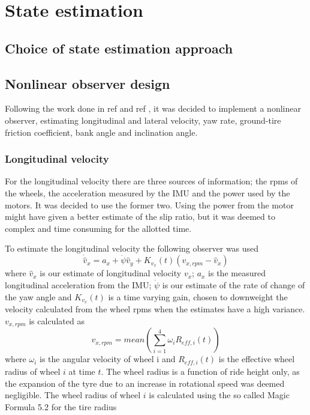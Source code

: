 \section{State estimation}
\subsection{Choice of state estimation approach}
\subsection{Nonlinear observer design}


Following the work done in ref \cite{Automatica08} and ref \cite{MainStateEst}, it was decided to implement a nonlinear observer, estimating longitudinal and lateral velocity, yaw rate, ground-tire friction coefficient, bank angle and inclination angle. 

\subsubsection{Longitudinal velocity}
For the longitudinal velocity there are three sources of information; the rpms of the wheels, the acceleration measured by the IMU and the power used by the motors. It was decided to use the former two. Using the power from the motor might have given a better estimate of the slip ratio, but it was deemed to complex and time consuming for the allotted time. 

To estimate the longitudinal velocity the following observer was used
\begin{equation}
    \dot{\hat{v}}_x = a_x + \dot{\psi}\hat{v}_y + K_{v_x}(t)(v_{x,rpm} - \hat{v}_x)
\end{equation}
where $\hat{v}_x$ is our estimate of longitudinal velocity $v_x$; $a_x$ is the measured longitudinal acceleration from the IMU; $\dot{\psi}$ is our estimate of the rate of change of the yaw angle and $K_{v_x}(t)$ is a time varying gain, chosen to downweight the velocity calculated from the wheel rpms when the estimates have a high variance. $v_{x,rpm}$ is calculated as 
\begin{equation}
    v_{x,rpm} = mean(\sum_{i=1}^{4} \omega_{i}R_{eff,i}(t))
\end{equation}
where $\omega_i$ is the angular velocity of wheel i and $R_{eff,i}(t)$ is the effective wheel radius of wheel $i$ at time $t$. The wheel radius is a function of ride height only, as the expansion of the tyre due to an increase in rotational speed was deemed negligible. The wheel radius of wheel $i$ is calculated using the so called Magic Formula 5.2 for the tire radius \cite{MagicFormula5_2}

